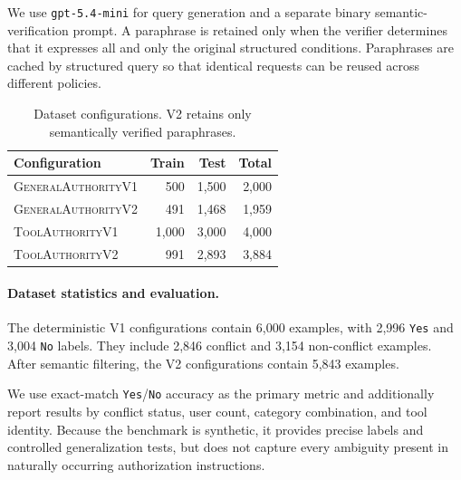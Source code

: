 We use \texttt{gpt-5.4-mini} for query generation and a separate binary
semantic-verification prompt. A paraphrase is retained only when the verifier
determines that it expresses all and only the original structured conditions.
Paraphrases are cached by structured query so that identical requests can be
reused across different policies.

\begin{table}[t]
\centering
\small
\setlength{\tabcolsep}{3.8pt}
\begin{tabular}{@{}lrrr@{}}
\toprule
Configuration & Train & Test & Total \\
\midrule
\textsc{GeneralAuthorityV1} & 500 & 1,500 & 2,000 \\
\textsc{GeneralAuthorityV2} & 491 & 1,468 & 1,959 \\
\textsc{ToolAuthorityV1}    & 1,000 & 3,000 & 4,000 \\
\textsc{ToolAuthorityV2}    & 991 & 2,893 & 3,884 \\
\bottomrule
\end{tabular}
\caption{Dataset configurations. V2 retains only semantically verified
paraphrases.}
\label{tab:authority-dataset-statistics}
\end{table}

\paragraph{Dataset statistics and evaluation.}
The deterministic V1 configurations contain 6,000 examples, with 2,996
\texttt{Yes} and 3,004 \texttt{No} labels. They include 2,846 conflict and
3,154 non-conflict examples. After semantic filtering, the V2 configurations
contain 5,843 examples.

We use exact-match \texttt{Yes}/\texttt{No} accuracy as the primary metric and
additionally report results by conflict status, user count, category
combination, and tool identity. Because the benchmark is synthetic, it provides
precise labels and controlled generalization tests, but does not capture every
ambiguity present in naturally occurring authorization instructions.
